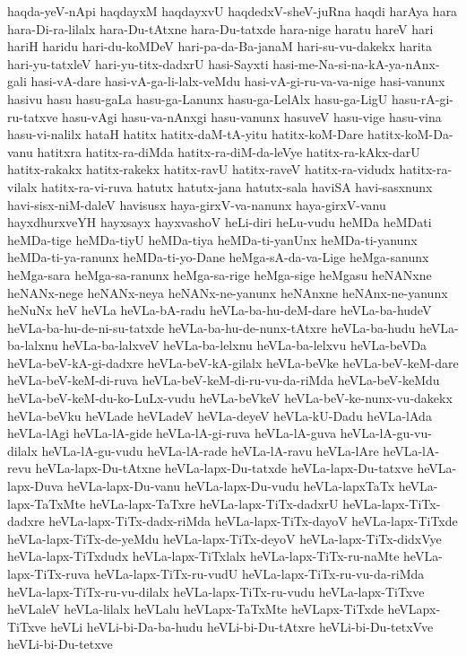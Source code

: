 {haqda-yeV-nApi
haqdayxM
haqdayxvU
haqdedxV-sheV-juRna
haqdi
harAya
hara
hara-Di-ra-lilalx
hara-Du-tAtxne
hara-Du-tatxde
hara-nige
haratu
hareV
hari
hariH
haridu
hari-du-koMDeV
hari-pa-da-Ba-janaM
hari-su-vu-dakekx
harita
hari-yu-tatxleV
hari-yu-titx-dadxrU
hasi-Sayxti
hasi-me-Na-si-na-kA-ya-nAnx-gali
hasi-vA-dare
hasi-vA-ga-li-lalx-veMdu
hasi-vA-gi-ru-va-va-nige
hasi-vanunx
hasivu
hasu
hasu-gaLa
hasu-ga-Lanunx
hasu-ga-LelAlx
hasu-ga-LigU
hasu-rA-gi-ru-tatxve
hasu-vAgi
hasu-va-nAnxgi
hasu-vanunx
hasuveV
hasu-vige
hasu-vina
hasu-vi-nalilx
hataH
hatitx
hatitx-daM-tA-yitu
hatitx-koM-Dare
hatitx-koM-Da-vanu
hatitxra
hatitx-ra-diMda
hatitx-ra-diM-da-leVye
hatitx-ra-kAkx-darU
hatitx-rakakx
hatitx-rakekx
hatitx-ravU
hatitx-raveV
hatitx-ra-vidudx
hatitx-ra-vilalx
hatitx-ra-vi-ruva
hatutx
hatutx-jana
hatutx-sala
haviSA
havi-sasxnunx
havi-sisx-niM-daleV
havisusx
haya-girxV-va-nanunx
haya-girxV-vanu
hayxdhurxveYH
hayxsayx
hayxvashoV
heLi-diri
heLu-vudu
heMDa
heMDati
heMDa-tige
heMDa-tiyU
heMDa-tiya
heMDa-ti-yanUnx
heMDa-ti-yanunx
heMDa-ti-ya-ranunx
heMDa-ti-yo-Dane
heMga-sA-da-va-Lige
heMga-sanunx
heMga-sara
heMga-sa-ranunx
heMga-sa-rige
heMga-sige
heMgasu
heNANxne
heNANx-nege
heNANx-neya
heNANx-ne-yanunx
heNAnxne
heNAnx-ne-yanunx
heNuNx
heV
heVLa
heVLa-bA-radu
heVLa-ba-hu-deM-dare
heVLa-ba-hudeV
heVLa-ba-hu-de-ni-su-tatxde
heVLa-ba-hu-de-nunx-tAtxre
heVLa-ba-hudu
heVLa-ba-lalxnu
heVLa-ba-lalxveV
heVLa-ba-lelxnu
heVLa-ba-lelxvu
heVLa-beVDa
heVLa-beV-kA-gi-dadxre
heVLa-beV-kA-gilalx
heVLa-beVke
heVLa-beV-keM-dare
heVLa-beV-keM-di-ruva
heVLa-beV-keM-di-ru-vu-da-riMda
heVLa-beV-keMdu
heVLa-beV-keM-du-ko-LuLx-vudu
heVLa-beVkeV
heVLa-beV-ke-nunx-vu-dakekx
heVLa-beVku
heVLade
heVLadeV
heVLa-deyeV
heVLa-kU-Dadu
heVLa-lAda
heVLa-lAgi
heVLa-lA-gide
heVLa-lA-gi-ruva
heVLa-lA-guva
heVLa-lA-gu-vu-dilalx
heVLa-lA-gu-vudu
heVLa-lA-rade
heVLa-lA-ravu
heVLa-lAre
heVLa-lA-revu
heVLa-lapx-Du-tAtxne
heVLa-lapx-Du-tatxde
heVLa-lapx-Du-tatxve
heVLa-lapx-Duva
heVLa-lapx-Du-vanu
heVLa-lapx-Du-vudu
heVLa-lapxTaTx
heVLa-lapx-TaTxMte
heVLa-lapx-TaTxre
heVLa-lapx-TiTx-dadxrU
heVLa-lapx-TiTx-dadxre
heVLa-lapx-TiTx-dadx-riMda
heVLa-lapx-TiTx-dayoV
heVLa-lapx-TiTxde
heVLa-lapx-TiTx-de-yeMdu
heVLa-lapx-TiTx-deyoV
heVLa-lapx-TiTx-didxVye
heVLa-lapx-TiTxdudx
heVLa-lapx-TiTxlalx
heVLa-lapx-TiTx-ru-naMte
heVLa-lapx-TiTx-ruva
heVLa-lapx-TiTx-ru-vudU
heVLa-lapx-TiTx-ru-vu-da-riMda
heVLa-lapx-TiTx-ru-vu-dilalx
heVLa-lapx-TiTx-ru-vudu
heVLa-lapx-TiTxve
heVLaleV
heVLa-lilalx
heVLalu
heVLapx-TaTxMte
heVLapx-TiTxde
heVLapx-TiTxve
heVLi
heVLi-bi-Da-ba-hudu
heVLi-bi-Du-tAtxre
heVLi-bi-Du-tetxVve
heVLi-bi-Du-tetxve
}
